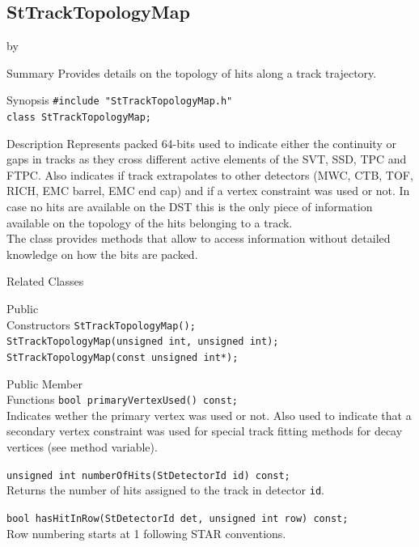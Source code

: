 \documentclass[twoside]{article}
\newcommand{\entrylabel}[1]{\mbox{\textbf{{#1}}}\hfil}%
\newenvironment{entry}
{\begin{list}{}%
    {\renewcommand{\makelabel}{\entrylabel}%
     \setlength{\labelwidth}{90pt}%
     \setlength{\leftmargin}{\labelwidth}
     \advance\leftmargin by \labelsep%
      }%
    }%
  {\end{list}}
\newcommand{\Entrylabel}[1]%
{\raisebox{0pt}[1ex][0pt]{\makebox[\labelwidth][l]%
    {\parbox[t]{\labelwidth}{\hspace{0pt}\textbf{{#1}}}}}}
\newenvironment{Entry}%
{\renewcommand{\entrylabel}{\Entrylabel}\begin{entry}}%
  {\end{entry}}
\begin{document}
\subsection{StTrackTopologyMap}
\label{sec:StTrackTopologyMap}
\begin{Entry}
\item[Summary] Provides details on the topology of hits along a track trajectory.
\item[Synopsis]
    \verb+#include "StTrackTopologyMap.h"+\\
    \verb+class StTrackTopologyMap;+\\
\item[Description]
    Represents packed 64-bits used to indicate either
    the continuity or gaps in tracks as they cross different active
    elements of the SVT, SSD, TPC and FTPC.  Also indicates if track
    extrapolates to other detectors (MWC, CTB, TOF, RICH, EMC barrel,
    EMC end cap) and if a vertex constraint was used or not.
    In case no hits are available on the DST this is the only piece
    of information available on the topology of the hits belonging
    to a track.\\
    The class provides methods that allow to access information without
    detailed knowledge on how the bits are packed.   

\item[Related Classes]
\item[Public\\ Constructors]
    \verb+StTrackTopologyMap();+\\
    \verb+StTrackTopologyMap(unsigned int, unsigned int);+\\
    \verb+StTrackTopologyMap(const unsigned int*);+\\
    
\item[Public Member\\ Functions]
    \verb+bool primaryVertexUsed() const;+\\
    Indicates wether the primary vertex was used or not.  Also used to
    indicate that a secondary vertex constraint was used for special
    track fitting methods for decay vertices (see method variable).

    \verb+unsigned int numberOfHits(StDetectorId id) const;+\\
    Returns the number of hits assigned to the track in detector \texttt{id}.
    
    \verb+bool hasHitInRow(StDetectorId det, unsigned int row) const;+\\
    Row numbering starts at 1 following STAR conventions.
    

\end{Entry}
\end{document}
